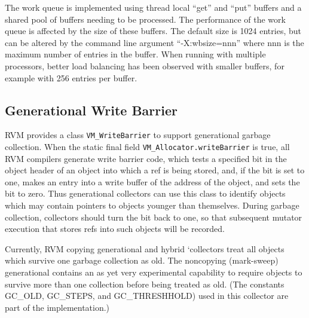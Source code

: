 The work queue is implemented using thread local ``get'' and ``put'' buffers
and a shared pool of buffers needing to be processed.  The performance of the
work queue is affected by the size of these buffers.  The default size is 1024 
entries, but can be altered by the command line argument ``-X:wbsize=nnn'' where
nnn is the maximum number of entries in the buffer.  When running with multiple
processors, better load balancing has been observed with smaller buffers, for
example with 256 entries per buffer.  

\subsection{Generational Write Barrier} \label{sssec:writebarrier}
RVM provides a class {\tt VM\_WriteBarrier} to support generational garbage 
collection. When the static 
final field {\tt VM\_Allocator.writeBarrier} is true,
all RVM compilers generate write barrier code, which tests a specified
bit in the object header of an object into which a ref is being stored,
and, if the bit is set to one, makes an entry into a write buffer of the 
address of the object, and sets the bit to zero.  Thus generational 
collectors can use this class to 
identify objects which may contain pointers to objects 
younger than themselves.  During garbage collection, collectors should
turn the bit back to one, so that subsequent mutator execution that stores
refs into such objects will be recorded.

Currently, RVM copying generational and hybrid 
`collectors treat all objects which
survive one garbage collection as old.  The noncopying (mark-sweep) 
generational contains an as yet very experimental capability to require
objects to survive more than one collection before being treated as old.
(The constants GC\_OLD, GC\_STEPS, and GC\_THRESHHOLD) used in this 
collector are part of the implementation.)


